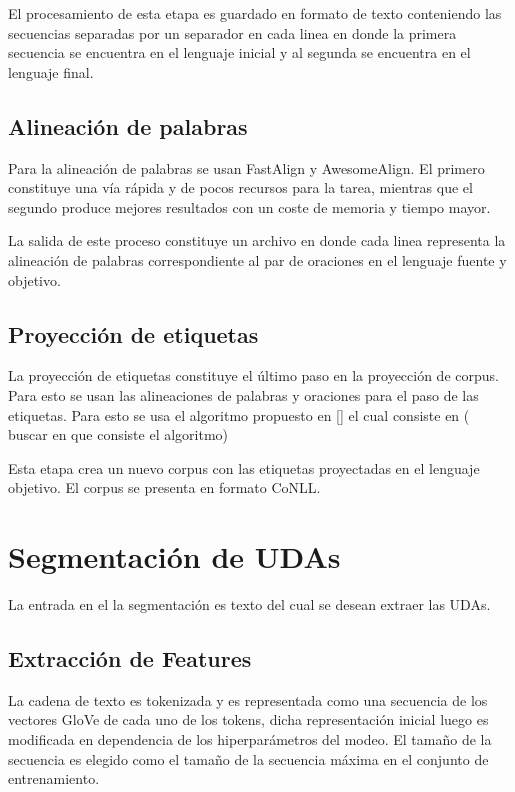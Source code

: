 El procesamiento de esta etapa es guardado en formato de texto conteniendo las 
secuencias separadas por un separador en cada linea en donde la primera secuencia se
encuentra en el lenguaje inicial y al segunda se encuentra en el lenguaje final.

\subsection{Alineación de palabras}

Para la alineación de palabras se usan FastAlign y AwesomeAlign. El primero constituye
una vía rápida y de pocos recursos para la tarea, mientras que el segundo produce mejores
resultados con un coste de memoria y tiempo mayor.

La salida de este proceso constituye un archivo en donde cada linea representa la 
alineación de palabras correspondiente al par de oraciones en el lenguaje fuente y objetivo. 

\subsection{Proyección de etiquetas}

La proyección de etiquetas constituye el último paso en la proyección de corpus. Para esto
se usan las alineaciones de palabras y oraciones para el paso de las etiquetas. Para esto
se usa el algoritmo propuesto en [\cite{eger2018cross}] el cual consiste en ( buscar en
que consiste el algoritmo)

Esta etapa crea un nuevo corpus con las etiquetas proyectadas en el lenguaje objetivo. El 
corpus se presenta en formato CoNLL.

\section{Segmentación de UDAs}

La entrada en el la segmentación es texto del cual se desean extraer las UDAs.

\subsection{Extracción de Features}

La cadena de texto es tokenizada y es representada como una secuencia 
de los vectores GloVe de cada uno de los tokens, dicha representación inicial 
luego es modificada en dependencia de los hiperparámetros del modeo. 
El tamaño de la secuencia es elegido como el tamaño de la secuencia máxima en el 
conjunto de entrenamiento.

